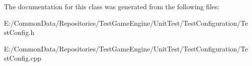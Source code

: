 The documentation for this class was generated from the following files\+:\begin{DoxyCompactItemize}
\item 
E\+:/\+Common\+Data/\+Repositories/\+Test\+Game\+Engine/\+Unit\+Test/\+Test\+Configuration/Test\+Config.\+h\item 
E\+:/\+Common\+Data/\+Repositories/\+Test\+Game\+Engine/\+Unit\+Test/\+Test\+Configuration/Test\+Config.\+cpp\end{DoxyCompactItemize}
